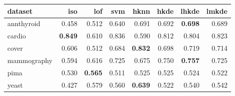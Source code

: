 \begin{tabular}{l|rrr|rrrr}
  \toprule
dataset & iso & lof & svm & hknn & hkde & lhkde & lmkde \\ 
  \midrule
annthyroid & 0.458 & 0.512 & 0.640 & 0.691 & 0.692 & {\bf 0.698} & 0.689 \\ 
  cardio & {\bf 0.849} & 0.610 & 0.836 & 0.590 & 0.812 & 0.804 & 0.823 \\ 
  cover & 0.606 & 0.512 & 0.684 & {\bf 0.832} & 0.698 & 0.719 & 0.714 \\ 
  mammography & 0.594 & 0.616 & 0.725 & 0.675 & 0.750 & {\bf 0.757} & 0.725 \\ 
  pima & 0.530 & {\bf 0.565} & 0.511 & 0.525 & 0.525 & 0.524 & 0.522 \\ 
  yeast & 0.427 & 0.579 & 0.560 & {\bf 0.639} & 0.522 & 0.540 & 0.542 \\ 
   \bottomrule
\end{tabular}

